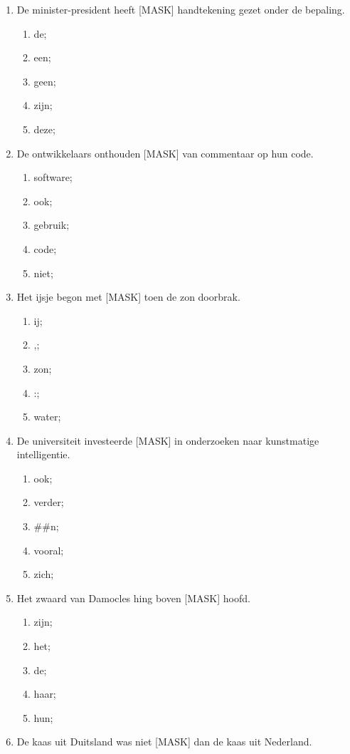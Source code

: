 \documentclass[a4paper, 11pt]{article}
\begin{document}
\begin{enumerate}
	\item De minister-president heeft [MASK] handtekening gezet onder de bepaling.
		\begin{enumerate}
		\item de;
		\item een;
		\item geen;
		\item zijn;
		\item deze;
	\end{enumerate}
	\item De ontwikkelaars onthouden [MASK] van commentaar op hun code.
	\begin{enumerate}
		\item software;
		\item ook;
		\item gebruik;
		\item code;
		\item niet;
	\end{enumerate}
	\item Het ijsje begon met [MASK] toen de zon doorbrak.
		\begin{enumerate}
		\item ij;
		\item ,;
		\item zon;
		\item :;
		\item water;
	\end{enumerate}
	\item De universiteit investeerde [MASK] in onderzoeken naar kunstmatige intelligentie.
	\begin{enumerate}
		\item ook;
		\item verder;
		\item \#\#n;
		\item vooral;
		\item zich;
	\end{enumerate}
	\item Het zwaard van Damocles hing boven [MASK] hoofd.
	\begin{enumerate}
		\item zijn;
		\item het;
		\item de;
		\item haar;
		\item hun;
	\end{enumerate}
	\item De kaas uit Duitsland was niet [MASK] dan de kaas uit Nederland.

\end{enumerate}
\end{document}
